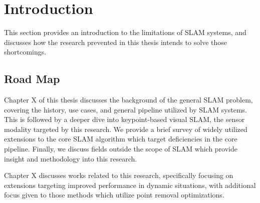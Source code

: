 \section{Introduction}

This section provides an introduction to the limitations of SLAM systems, and discusses how the research prevented in this thesis intends to solve those shortcomings.







\subsection{Road Map}

Chapter X of this thesis discusses the background of the general SLAM problem, covering the history, use cases, and general pipeline utilized by SLAM systems. This is followed by a deeper dive into keypoint-based visual SLAM, the sensor modality targeted by this research. We provide a brief survey of widely utilized extensions to the core SLAM algorithm which target deficiencies in the core pipeline. Finally, we discuss fields outside the scope of SLAM which provide insight and methodology into this research.

Chapter X discusses works related to this research, specifically focusing on extensions targeting improved performance in dynamic situations, with additional focus given to those methods which utilize point removal optimizations.